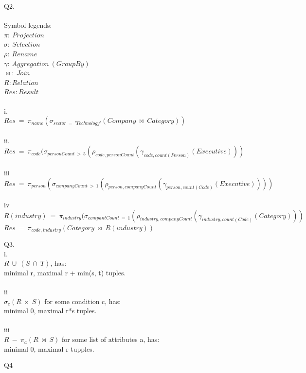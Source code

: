 \documentclass[a4paper]{article}
\begin{document}
\par
Q2.\\
\\Symbol legends:\\
$\pi:\ Projection$\\
$\sigma:\ Selection$\\
$\rho:\ Rename$\\
$\gamma:\ Aggregation\ (GroupBy)$\\
$\bowtie:\ Join$\\
$R: Relation$\\
$Res: Result$\\
\\
i.\\
$Res\ =\ \pi _{name}(\sigma_{sector\ =\ 'Technology'}(Company\ \bowtie\ Category))$\\
\\ii.\\
$Res\ =\ \pi _{code}(\sigma_{personCount\ >\ 5}(\rho _{code,personCount}(\gamma _{code, count(Person)}(Executive)))  $\\
\\iii\\
$Res\ =\ \pi _{person}(\sigma _{companyCount\ >\ 1}(\rho _{person, companyCount} ( \gamma _{person, count(Code)}(Executive)))) $\\
\\iv\\
$R(industry)\ =\  \pi _{industry}(\sigma _{compantCount\ =\ 1}(\rho _{industry, companyCount}(\gamma _{industry, count(Code)}(Category)))$\\
$Res\ =\ \pi _{code, industry}(Category\ \bowtie \ R(industry))$\\
\par
Q3.\\
i.\\
$R\ \cup \ (S\ \cap \ T)$, has:\\
minimal r, maximal r + min(s, t) tuples.\\
\\ii\\
$\sigma _{c}(R\ \times \ S)$ for some condition c, has:\\
minimal 0, maximal r*s tuples.\\
\\iii\\
$R\ -\ \pi _{a}(R\  \bowtie \ S)$ for some list of attributes a, has:\\
minimal 0, maximal r tupples.\\
\par
Q4\\
\end{document}

